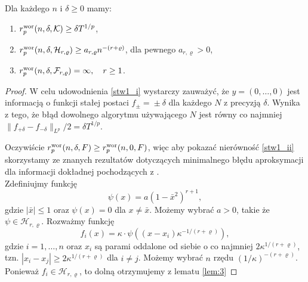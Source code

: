 \documentclass[oik, pdftex, man]{mgrwms}
\begin{document}
    \begin{stw} \label{stw1}
        Dla każdego $n$ i $\delta \geq 0$ mamy:
        \begin{enumerate}[label=(\roman*)]
            \item \label{stw1_i} $r^{\mathrm{wor}}_{p}(n, \delta, \mathcal{K}) \geq \delta T^{1/p}$,
            \item \label{stw1_ii} $r^{\mathrm{wor}}_{p}(n, \delta, \mathcal{H}_{r,\varrho}) \geq a_{r,\varrho}n^{-(r + \varrho)}$, dla pewnego $a_{r,\varrho} > 0$,
            \item \label{stw1_iii} $r^{\mathrm{wor}}_{p}(n, \delta, \mathcal{F}_{r,\varrho}) = \infty, \quad r \geq 1$.
        \end{enumerate}
    \end{stw}
    \begin{proof}
        W celu udowodnienia \ref{stw1_i} wystarczy zauważyć, że $y = (0, \ldots, 0)$ jest informacją o funkcji stałej postaci $f_{\pm} \!=\! \pm \delta$ dla każdego $N$ z precyzją $\delta$. Wynika z tego, że błąd dowolnego algorytmu używającego $N$ jest równy co najmniej $\| f_{+\delta} - f_{-\delta} \|_{L^{p}} / 2 = \delta T^{1/p}$.

        Oczywiście $r^{\mathrm{wor}}_{p}(n, \delta, F) \geq r^{\mathrm{wor}}_{p}(n, 0, F)$, więc aby pokazać nierówność \ref{stw1_ii} skorzystamy ze znanych rezultatów dotyczących minimalnego błędu aproksymacji dla informacji dokładnej pochodzących z \cite{DaS}. \\
        Zdefiniujmy funkcję
        \begin{equation*}
            \psi(x) = a (1 - \bar{x}^{2})^{r+1},
        \end{equation*}
        gdzie $|\bar{x}| \leq 1$ oraz $\psi(x) = 0$ dla $x \neq \bar{x}$. Możemy wybrać $a > 0$, takie że $\psi \in \mathcal{H}_{r,\varrho}$.
        Rozważmy funkcję
        \begin{equation*}
            f_{i}(x) = \kappa \cdot \psi \left( (x-x_{i}) \kappa^{-1 / (r+\varrho)} \right),
        \end{equation*}
        gdzie $i = 1, \ldots, n$ oraz $x_{i}$ są parami oddalone od siebie o co najmniej $2\kappa^{1/(r+\varrho)}$, tzn. $|x_{i} - x_{j}| \geq 2\kappa^{1/(r+\varrho)}$ dla $i \neq j$. Możemy wybrać $n$ rzędu $(1/\kappa)^{-(r + \varrho)}$. Ponieważ $f_{i} \in \mathcal{H}_{r,\varrho}$, to dolną otrzymujemy z lematu \ref{lem:3}



\end{proof}
\end{document}
